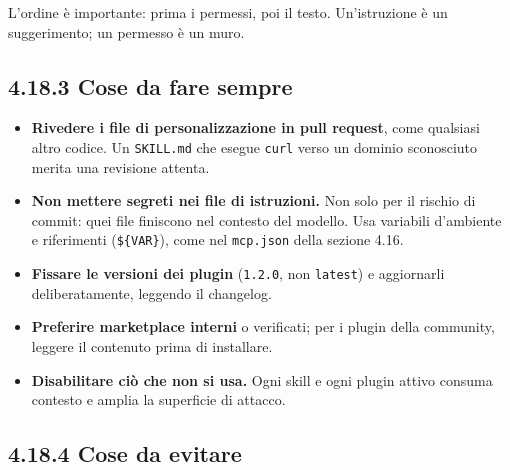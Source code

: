 \documentclass[
  italian,
  10pt,
]{book}
\providecommand{\tightlist}{%
  \setlength{\itemsep}{0pt}\setlength{\parskip}{0pt}}
\begin{document}
L'ordine è importante: prima i permessi, poi il testo. Un'istruzione è
un suggerimento; un permesso è un muro.

\subsection{4.18.3 Cose da fare sempre}\label{cose-da-fare-sempre}

\begin{itemize}
\tightlist
\item
  \textbf{Rivedere i file di personalizzazione in pull request}, come
  qualsiasi altro codice. Un \texttt{SKILL.md} che esegue \texttt{curl}
  verso un dominio sconosciuto merita una revisione attenta.
\item
  \textbf{Non mettere segreti nei file di istruzioni.} Non solo per il
  rischio di commit: quei file finiscono nel contesto del modello. Usa
  variabili d'ambiente e riferimenti (\texttt{\$\{VAR\}}), come nel
  \texttt{mcp.json} della sezione 4.16.
\item
  \textbf{Fissare le versioni dei plugin} (\texttt{1.2.0}, non
  \texttt{latest}) e aggiornarli deliberatamente, leggendo il changelog.
\item
  \textbf{Preferire marketplace interni} o verificati; per i plugin
  della community, leggere il contenuto prima di installare.
\item
  \textbf{Disabilitare ciò che non si usa.} Ogni skill e ogni plugin
  attivo consuma contesto e amplia la superficie di attacco.
\end{itemize}

\subsection{4.18.4 Cose da evitare}\label{cose-da-evitare}
\end{document}
